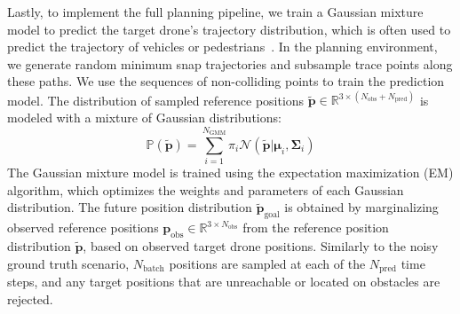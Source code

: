 Lastly, to implement the full planning pipeline, we train a Gaussian mixture model to predict the target drone’s trajectory distribution, which is often used to predict the trajectory of vehicles or pedestrians~\cite{wiest2012probabilistic, wakulicz2023topological, salzmann2020trajectron}.
In the planning environment, we generate random minimum snap trajectories and subsample trace points along these paths. 
We use the sequences of non-colliding points to train the prediction model. 
The distribution of sampled reference positions $\tilde{\mathbf{p}} \in \mathbb{R}^{3 \times (N_\text{obs}+N_\text{pred})}$ is modeled with a mixture of Gaussian distributions:
\begin{equation}
    \mathbb{P}(\tilde{\mathbf{p}}) = \sum_{i=1}^{N_\text{GMM}} \pi_i \mathcal{N}(\tilde{\mathbf{p}}| \mathbf\mu_i, \mathbf\Sigma_i)
\end{equation}
The Gaussian mixture model is trained using the expectation maximization (EM) algorithm, which optimizes the weights and parameters of each Gaussian distribution. 
The future position distribution $\tilde{\mathbf{p}}_{\text{goal}}$ is obtained by marginalizing observed reference positions $\mathbf{p}_{\text{obs}} \in \mathbb{R}^{3 \times N_\text{obs}}$ from the reference position distribution $\tilde{\mathbf{p}}$, based on observed target drone positions.
Similarly to the noisy ground truth scenario, $N_\text{batch}$ positions are sampled at each of the $N_\text{pred}$ time steps, and any target positions that are unreachable or located on obstacles are rejected.

